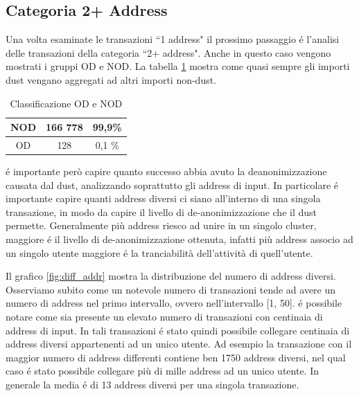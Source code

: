 \subsection{Categoria 2+ Address}
Una volta esaminate le transazioni ``1 address" il prossimo passaggio é l'analisi delle transazioni della categoria ``2+ address". Anche in questo caso vengono mostrati i gruppi OD e NOD. La tabella \ref{tab:OD_NOD_success} mostra come quasi sempre gli importi dust vengano aggregati ad altri importi non-dust.
\begin{table}[H]
    \centering
    \begin{tabular}{|c|c|c|}
        \hline
            NOD  & 166 778 & 99,9\%\\
        \hline 
            OD  & 128 & 0,1 \%\\
        \hline
    \end{tabular}
    \caption{Classificazione OD e NOD}
    \label{tab:OD_NOD_success}
\end{table}
é importante però capire quanto successo abbia avuto la deanonimizzazione causata dal dust, analizzando soprattutto gli address di input. In particolare é importante capire quanti address diversi ci siano all'interno di una singola transazione, in modo da capire il livello di de-anonimizzazione che il dust permette. Generalmente più address riesco ad unire in un singolo cluster, maggiore é il livello di de-anonimizzazione ottenuta, infatti più address associo ad un singolo utente maggiore é la tranciabilità dell'attività di quell'utente.

Il grafico \ref{fig:diff_addr} mostra la distribuzione del numero di address diversi. Osserviamo subito come un notevole numero di transazioni tende ad avere un numero di address nel primo intervallo, ovvero nell'intervallo [1, 50]. é possibile notare come sia presente un elevato numero di transazioni con centinaia di address di input. In tali transazioni é stato quindi possibile collegare centinaia di address diversi appartenenti ad un unico utente. Ad esempio la transazione con il maggior numero di address differenti contiene ben 1750 address diversi, nel qual caso é stato possibile collegare più di mille address ad un unico utente. In generale la media é di 13 address diversi per una singola transazione. 

